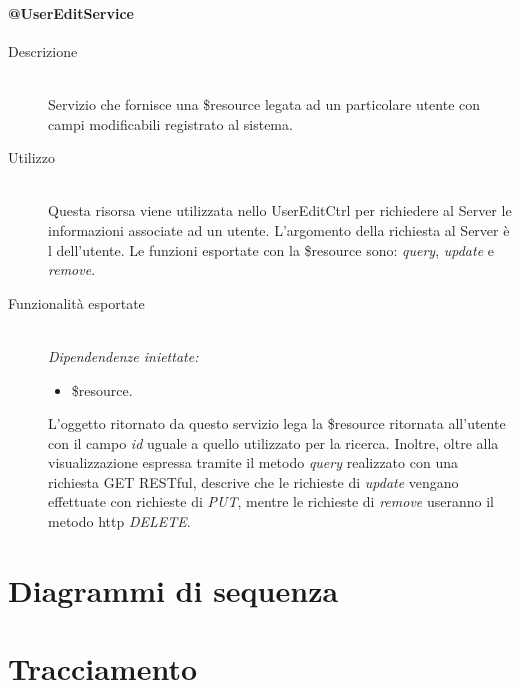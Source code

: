 \paragraph{@UserEditService}
\begin{description}
 \item[Descrizione] \hfill \\
 Servizio che fornisce una \$resource legata ad un particolare utente con campi modificabili registrato al sistema.
 \item[Utilizzo] \hfill \\
  Questa risorsa viene utilizzata nello UserEditCtrl per richiedere al Server le informazioni associate ad un utente. L'argomento della richiesta al 
  Server è l dell'utente. Le funzioni esportate con la \$resource sono: \textit{query}, \textit{update} e 
  \textit{remove}.
 \item[Funzionalità esportate] \hfill \\
 \emph{Dipendendenze iniettate:}
 \begin{itemize}
  \item \$resource.
 \end{itemize}
  L'oggetto ritornato da questo servizio lega la \$resource ritornata all'utente con il campo 
  \textit{id} uguale a quello utilizzato per la ricerca. Inoltre, oltre alla visualizzazione espressa tramite il metodo \textit{query} realizzato con una richiesta GET RESTful, descrive che le richieste di \emph{update} vengano effettuate
 con richieste di \emph{PUT}, mentre le richieste di \emph{remove} useranno il metodo http \emph{DELETE}.
\end{description}

\newpage
\section{Diagrammi di sequenza}


\appendix


\newpage


\section{Tracciamento}







